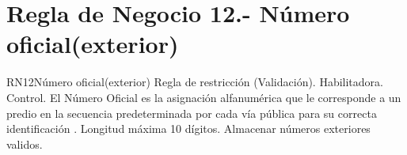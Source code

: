 \section{Regla de Negocio 12.- Número oficial(exterior)}

\begin{BussinesRule}{RN12}{Número oficial(exterior)}
	\BRitem[Tipo:] Regla de restricción (Validación).
	\BRitem[Clase:] Habilitadora. 
	\BRitem[Nivel:] Control. %
	\BRitem[Descripción:]  El Número Oficial es la asignación alfanumérica que le corresponde a un predio en la secuencia predeterminada por cada vía pública para su correcta identificación \cite{NO}. Longitud máxima 10 dígitos. 
	\BRitem[Motivación:] Almacenar números exteriores validos. 

\end{BussinesRule}
